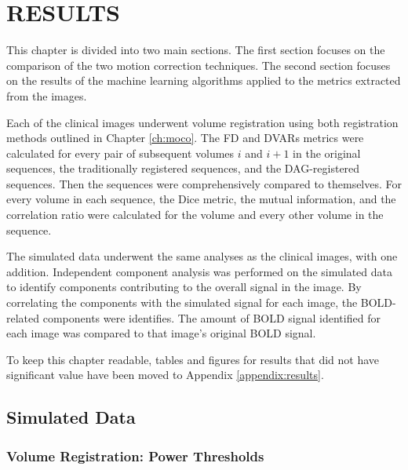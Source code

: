 \chapter{RESULTS}
\label{ch:results}

This chapter is divided into two main sections. The first section focuses on the comparison of the two motion correction techniques. The second section focuses on the results of the machine learning algorithms applied to the metrics extracted from the images.

Each of the clinical images underwent volume registration using both registration methods outlined in Chapter \ref{ch:moco}. The FD and DVARs metrics were calculated for every pair of subsequent volumes $i$ and $i+1$ in the original sequences, the traditionally registered sequences, and the DAG-registered sequences. Then the sequences were comprehensively compared to themselves. For every volume in each sequence, the Dice metric, the mutual information, and the correlation ratio were calculated for the volume and every other volume in the sequence.

The simulated data underwent the same analyses as the clinical images, with one addition. Independent component analysis was performed on the simulated data to identify components contributing to the overall signal in the image. By correlating the components with the simulated signal for each image, the BOLD-related components were identifies. The amount of BOLD signal identified for each image was compared to that image's original BOLD signal.

To keep this chapter readable, tables and figures for results that did not have significant value have been moved to Appendix \ref{appendix:results}.

\section{Simulated Data}

\subsection{Volume Registration: Power Thresholds}

